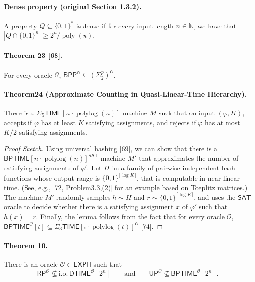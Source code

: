 \documentclass[10pt,a4paper]{article}
\begin{document}
\paragraph{Dense property (original Section 1.3.2).} A property $Q\subseteq\{0,1\}^*$ is dense if for every input length $n\in\mathbb N$, we have that $|Q\cap\{0,1\}^n|\geq2^n/\operatorname{poly}(n)$.
\paragraph{Theorem 23 [68].} For every oracle $\mathcal O$, $\mathsf{BPP}^{\mathcal O}\subseteq(\Sigma^p_2)^{\mathcal O}$.

\paragraph{Theorem24 (Approximate Counting in Quasi-Linear-Time Hierarchy).} There is a $\Sigma_5\mathsf{TIME}[n\cdot\operatorname{polylog}(n)]$ machine $M$ such that on input $(\varphi,K)$, accepts if $\varphi$ has at least $K$ satisfying assignments, and rejects if $\varphi$ has at most $K/2$ satisfying assignments.
\begin{proof}[Proof Sketch]
Using universal hashing [69], we can show that there is a $\mathsf{BPTIME}[n\cdot\operatorname{polylog}(n)]^{\mathsf{SAT}}$ machine $M'$ that approximates the number of satisfying assignments of $\varphi'$. Let $H$ be a family of pairwise-independent hash functions whose output range is $\{0,1\}^{\lceil\log K\rceil}$, that is computable in near-linear time. (See, e.g., [72, Problem3.3,(2)] for an example based on Toeplitz matrices.) The machine $M'$ randomly samples $h\sim H$ and $r\sim\{0,1\}^{\lceil\log K\rceil}$, and uses the $\mathsf{SAT}$ oracle to decide whether there is a satisfying assignment $x$ of $\varphi'$ such that $h(x)=r$.
Finally, the lemma follows from the fact that for every oracle $\mathcal O$, $\mathsf{BPTIME}^{\mathcal O}[t]\subseteq\Sigma_3\mathsf{TIME}[t\cdot\operatorname{polylog}(t)]^{\mathcal O}$ [74].
\end{proof}

\paragraph{Theorem 10.} There is an oracle $\mathcal O\in\mathsf{EXPH}$ such that
\[\mathsf{RP}^{\mathcal O}\not\subseteq\mathrm{i.o.}\,\mathsf{DTIME}^{\mathcal O}[2^n]\qquad\text{and}\qquad\mathsf{UP}^{\mathcal O}\not\subseteq\mathsf{BPTIME}^{\mathcal O}[2^n].\]
\end{document}
